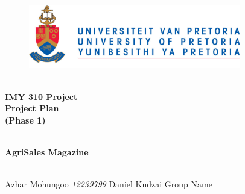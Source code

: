 \begin{titlepage}
	\begin{center}
		
		\begin{figure}[t]
			\centering
			\includegraphics[width=350px]{../Images/UP_Logo.png}
		\end{figure}
		
		\textsc{\large } \\ 
		\vspace{3cm}
		\textbf{\Huge IMY 310 Project  \\
			Project Plan \\
			(Phase 1)} \\ 

		\textsc{\large } \\ 
		\vspace{0.5cm}

		\textbf{\Large AgriSales Magazine} \\ 
		
		\textsc{\large } \\ 
		\vspace{0.5cm}
		
		\begin{flushright} \large
			Azhar Mohungoo 	\emph{12239799} \newline
			Daniel  	\emph{} \newline
			Kudzai  	\emph{} \newline
			\newline
			Group Name  \emph{} \newline
			\end{flushright}
		
	\end{center}
\end{titlepage}
